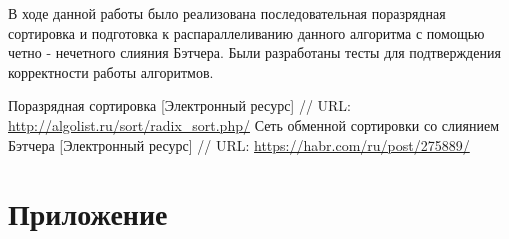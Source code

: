 \documentclass{report}
\begin{document}
В ходе данной работы было реализована последовательная поразрядная сортировка и подготовка к распараллеливанию данного алгоритма с помощью четно - нечетного слияния Бэтчера. Были разработаны тесты для подтверждения корректности работы алгоритмов.

\newpage
\begin{thebibliography}{1}
 Поразрядная сортировка [Электронный ресурс] // URL: \url{http://algolist.ru/sort/radix_sort.php/}
 Сеть обменной сортировки со слиянием Бэтчера [Электронный ресурс] // URL: \url{https://habr.com/ru/post/275889/}
\end{thebibliography}

\newpage
\section*{Приложение}
\end{document}
